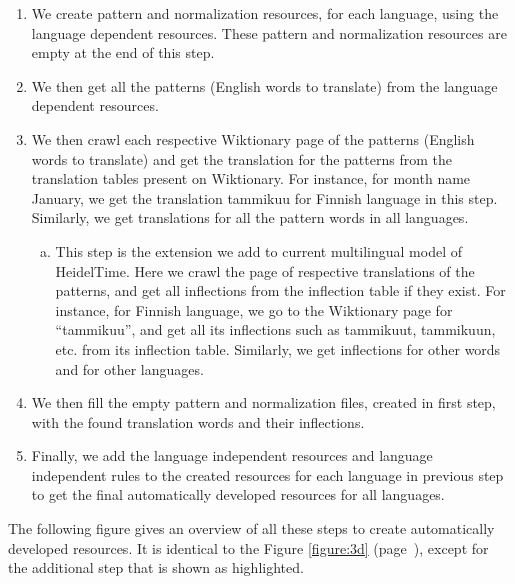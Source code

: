 \begin{enumerate}[1.]
	\item We create pattern and normalization resources, for each language, using the language dependent resources. These pattern and normalization resources are empty at the end of this step.
	\item We then get all the patterns (English words to translate) from the language dependent resources. 
	\item We then crawl each respective Wiktionary page of the patterns (English words to translate) and get the translation for the patterns from the translation tables present on Wiktionary. For instance, for month name January, we get the translation tammikuu for Finnish language in this step. Similarly, we get translations for all the pattern words in all languages.  
		\begin{enumerate}[a.]
		\item \label{extension-step-3a} This step is the extension we add to current multilingual model of HeidelTime. Here we crawl the page of respective translations of the patterns, and get all inflections from the inflection table if they exist. For instance, for Finnish language, we go to the Wiktionary page for ``tammikuu'', and get all its inflections such as tammikuut, tammikuun, etc. from its inflection table. Similarly, we get inflections for other words and for other languages. 
		\end{enumerate}
	\item We then fill the empty pattern and normalization files, created in first step, with the found translation words and their inflections. 
	\item Finally, we add the language independent resources and language independent rules to the created resources for each language in previous step to get the final automatically developed resources for all languages. 
\end{enumerate} 

The following figure gives an overview of all these steps to create automatically developed resources. It is identical to the Figure \ref{figure:3d} (page~\pageref{figure:3d}), except for the additional step that is shown as highlighted. 

